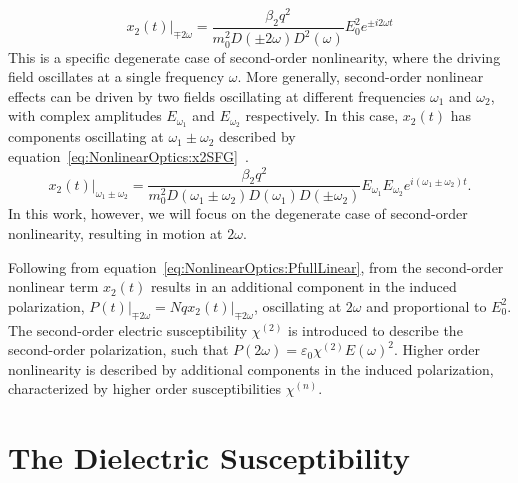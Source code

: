 \begin{equation}
	x_{2}(t)\vert_{\mp 2\omega} = \frac{\beta_2 q^2}{m_{0}^2 D(\pm 2\omega) D^{2}(\omega)} E_0^2 e^{\pm i 2\omega t}
\end{equation}
This is a specific degenerate case of second-order nonlinearity, where the driving field oscillates at a single frequency $\omega$. More generally, second-order nonlinear effects can be driven by two fields oscillating at different frequencies $\omega_1$ and $\omega_2$, with complex amplitudes $E_{\omega_1}$ and  $E_{\omega_2}$ respectively. In this case, $x_{2}(t)$ has components oscillating at $\omega_1 \pm \omega_2$ described by equation~\ref{eq:NonlinearOptics:x2SFG}~\cite[\S 1.4.1]{Boyd2008a}.
\begin{equation}\label{eq:NonlinearOptics:x2SFG}
	x_{2}(t)\vert_{\omega_1 \pm \omega_2} = \frac{\beta_2 q^2}{m_{0}^2 D(\omega_1 \pm \omega_2) D(\omega_1) D(\pm\omega_2)} E_{\omega_1} E_{\omega_2} e^{i (\omega_1 \pm \omega_2) t}.
\end{equation}
In this work, however, we will focus on the degenerate case of second-order nonlinearity, resulting in motion at $2\omega$.

Following from equation~\ref{eq:NonlinearOptics:PfullLinear}, from  the second-order nonlinear term $x_{2}(t)$ results in an additional component in the induced polarization, $P(t)\vert_{\mp 2\omega} = N q x_{2}(t)\vert_{\mp 2\omega}$, oscillating at $2\omega$ and proportional to $E_0^2$. The second-order electric susceptibility $\chi^{(2)}$ is introduced to describe the second-order polarization, such that $P(2\omega) = \varepsilon_0 \chi^{(2)} E(\omega)^2$. Higher order nonlinearity is described by additional components in the induced polarization, characterized by higher order susceptibilities $\chi^{(n)}$.

\section{The Dielectric Susceptibility}\label{sec:background:NonlinearOptics:susceptibility}

